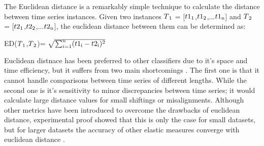 The Euclidean distance is a remarkably simple technique to calculate the distance between time series instances.
Given two instances  $T\textsubscript{1}$ = [$t1\textsubscript{1}$,$t1\textsubscript{2}$,...$t1\textsubscript{n}$]
and $T\textsubscript{2}$ = [$t2\textsubscript{1}$,$t2\textsubscript{2}$,...$t2\textsubscript{n}$], the euclidean distance
between them can be determined as:
\begin{definition}
    ED($T\textsubscript{1}$,$T\textsubscript{2}$)= $\sqrt{\sum_{i=1}^{n} (t1\textsubscript{i} - t2\textsubscript{i})^{2}}$
\end{definition}
Euclidean distnace has been preferred to other classifiers due to it's space and time efficiency, but it suffers from two main shortcomings \cite{baydogan2013bag, jeong2011weighted,kate2016using}.
The first one is that it cannot handle comparisons between time series of different lengths.
While the second one is it's sensitivity to minor discrepancies between time series; it would calculate large distance values for small shiftings or misalignments.
Although other metrics have been introduced to overcome the drawbacks of euclidean distance,
experimental proof showed that this is only the case for small datasets, but for larger datasets the accuracy of other elastic measures
converge with euclidean distance \cite{hills2014classification,ding2008querying,bagnall2012transformation}.